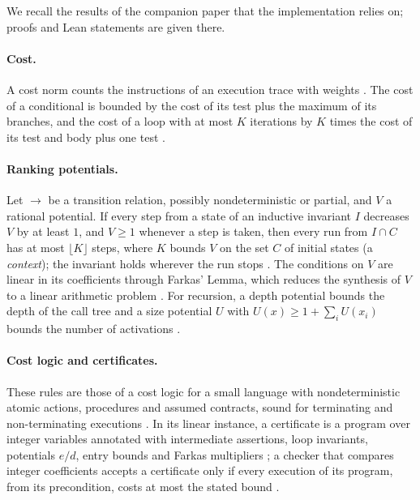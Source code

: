 \documentclass[oneside,english]{amsart}
\numberwithin{equation}{section}
\numberwithin{figure}{section}
\theoremstyle{plain}
\theoremstyle{definition}
\theoremstyle{plain}
\theoremstyle{remark}
\theoremstyle{plain}
\theoremstyle{definition}
\theoremstyle{plain}
\theoremstyle{remark}
\begin{document}
We recall the results of the companion paper \cite{crosscheckTheory} that the implementation relies on; proofs and Lean statements are given there.

\paragraph{Cost.} A cost norm counts the instructions of an execution trace with weights \cite[Definition~\ref{I-def:subadditive-norm}]{crosscheckTheory}. The cost of a conditional is bounded by the cost of its test plus the maximum of its branches, and the cost of a loop with at most $K$ iterations by $K$ times the cost of its test and body plus one test \cite[Section~\ref{I-subsubsec:tropical-semiring}]{crosscheckTheory}.

\paragraph{Ranking potentials.} Let $\to$ be a transition relation, possibly nondeterministic or partial, and $V$ a rational potential. If every step from a state of an inductive invariant $I$ decreases $V$ by at least $1$, and $V \ge 1$ whenever a step is taken, then every run from $I \cap C$ has at most $\lfloor K \rfloor$ steps, where $K$ bounds $V$ on the set $C$ of initial states (a \emph{context}); the invariant holds wherever the run stops \cite[Proposition~\ref{I-prop:context-bound}]{crosscheckTheory}. The conditions on $V$ are linear in its coefficients through Farkas' Lemma, which reduces the synthesis of $V$ to a linear arithmetic problem \cite[Section~\ref{I-subsubsec:smt-synthesis}]{crosscheckTheory}. For recursion, a depth potential bounds the depth of the call tree and a size potential $U$ with $U(x) \ge 1 + \sum_i U(x_i)$ bounds the number of activations \cite[Proposition~\ref{I-prop:size-potential}]{crosscheckTheory}.

\paragraph{Cost logic and certificates.} These rules are those of a cost logic for a small language with nondeterministic atomic actions, procedures and assumed contracts, sound for terminating and non-terminating executions \cite[Theorem~\ref{I-thm:cost-logic-soundness}]{crosscheckTheory}. In its linear instance, a certificate is a program over integer variables annotated with intermediate assertions, loop invariants, potentials $e/d$, entry bounds and Farkas multipliers \cite[Definition~\ref{I-def:certificate}]{crosscheckTheory}; a checker that compares integer coefficients accepts a certificate only if every execution of its program, from its precondition, costs at most the stated bound \cite[Theorem~\ref{I-thm:checker-soundness}]{crosscheckTheory}.
\end{document}
